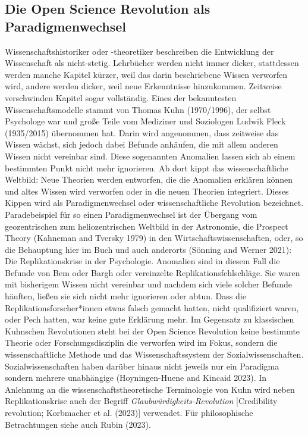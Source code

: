 \documentclass[
  letterpaper,
  DIV=11,
  numbers=noendperiod]{scrreprt}
\begin{document}
\subsection{Die Open Science Revolution als
Paradigmenwechsel}\label{die-open-science-revolution-als-paradigmenwechsel}

Wissenschaftshistoriker oder -theoretiker beschreiben die Entwicklung
der Wissenschaft als nicht-stetig. Lehrbücher werden nicht immer dicker,
stattdessen werden manche Kapitel kürzer, weil das darin beschriebene
Wissen verworfen wird, andere werden dicker, weil neue Erkenntnisse
hinzukommen. Zeitweise verschwinden Kapitel sogar vollständig. Eines der
bekanntesten Wissenschaftsmodelle stammt von Thomas Kuhn (1970/1996),
der selbst Psychologe war und große Teile vom Mediziner und Soziologen
Ludwik Fleck (1935/2015) übernommen hat. Darin wird angenommen, dass
zeitweise das Wissen wächst, sich jedoch dabei Befunde anhäufen, die mit
allem anderen Wissen nicht vereinbar sind. Diese sogenannten Anomalien
lassen sich ab einem bestimmten Punkt nicht mehr ignorieren. Ab dort
kippt das wissenschaftliche Weltbild: Neue Theorien werden entworfen,
die die Anomalien erklären können und altes Wissen wird verworfen oder
in die neuen Theorien integriert. Dieses Kippen wird als
Paradigmenwechsel oder wissenschaftliche Revolution bezeichnet.
Paradebeispiel für so einen Paradigmenwechsel ist der Übergang vom
geozentrischen zum heliozentrischen Weltbild in der Astronomie, die
Prospect Theory (Kahneman and Tversky 1979) in den
Wirtschaftswissenschaften, oder, so die Behauptung hier im Buch und auch
anderorts (Sönning and Werner 2021): Die Replikationskrise in der
Psychologie. Anomalien sind in diesem Fall die Befunde von Bem oder
Bargh oder vereinzelte Replikationsfehlschläge. Sie waren mit bisherigem
Wissen nicht vereinbar und nachdem sich viele solcher Befunde häuften,
ließen sie sich nicht mehr ignorieren oder abtun. Dass die
Replikationsforscher*innen etwas falsch gemacht hatten, nicht
qualifiziert waren, oder Pech hatten, war keine gute Erklärung mehr. Im
Gegensatz zu klassischen Kuhnschen Revolutionen steht bei der Open
Science Revolution keine bestimmte Theorie oder Forschungsdisziplin die
verworfen wird im Fokus, sondern die wissenschaftliche Methode und das
Wissenschaftssystem der Sozialwissenschaften. Sozialwissenschaften haben
darüber hinaus nicht jeweils nur ein Paradigma sondern mehrere
unabhängige (Hoyningen-Huene and Kincaid 2023). In Anlehnung an die
wissenschaftstheoretische Terminologie von Kuhn wird neben
Replikationskrise auch der Begriff \emph{Glaubwürdigkeits-Revolution}
{[}Credibility revolution; Korbmacher et al. (2023){]} verwendet. Für
philosophische Betrachtungen siehe auch Rubin (2023).
\end{document}
